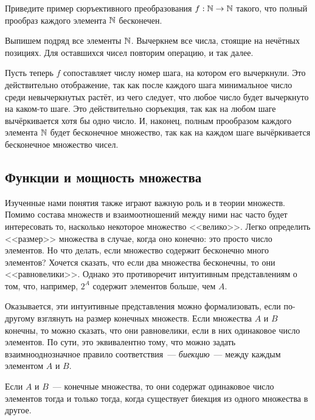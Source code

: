 \begin{Exercise}[counter=SecExercise, label={exercise:functions:infinite_surjection}]
    \noindent
    Приведите пример сюръективного преобразования $ f: \mathbb{N} \to \mathbb{N} $ такого, что полный прообраз каждого элемента $ \mathbb{N} $ бесконечен.
\end{Exercise}

\begin{Answer}
    \noindent
    Выпишем подряд все элементы $ \mathbb{N} $.
    Вычеркнем все числа, стоящие на нечётных позициях.
    Для оставшихся чисел повторим операцию, и так далее.

    Пусть теперь $ f $ сопоставляет числу номер шага, на котором его вычеркнули.
    Это действительно отображение, так как после каждого шага минимальное число среди невычеркнутых растёт,
    из чего следует, что любое число будет вычеркнуто на каком-то шаге.
    Это действительно сюръекция, так как на любом шаге вычёркивается хотя бы одно число.
    И, наконец, полным прообразом каждого элемента $ \mathbb{N} $ будет бесконечное множество,
    так как на каждом шаге вычёркивается бесконечное множество чисел.
\end{Answer}


\subsection{Функции и мощность множества}
\label{subsec:functions:cardinality}

Изученные нами понятия также играют важную роль и в теории множеств.
Помимо состава множеств и взаимоотношений между ними нас часто будет интересовать то, насколько некоторое множество <<велико>>.
Легко определить <<размер>> множества в случае, когда оно конечно: это просто число элементов.
Но что делать, если множество содержит бесконечно много элементов?
Хочется сказать, что если два множества бесконечны, то они <<равновелики>>.
Однако это противоречит интуитивным представлениям о том, что, например, $ 2^A $ содержит элементов больше, чем $ A $.

Оказывается, эти интуитивные представления можно формализовать, если по-другому взглянуть на размер конечных множеств.
Если множества $ A $ и $ B $ конечны, то можно сказать, что они равновелики, если в них одинаковое число элементов.
По сути, это эквивалентно тому, что можно задать взаимнооднозначное правило соответствия~--- \textit{биекцию}~--- между каждым элементом $ A $ и $ B $.

\begin{statement}
    \label{statement:functions:finite_bijection}
    Если $ A $ и $ B $~--- конечные множества, то они содержат одинаковое число элементов тогда и только тогда,
    когда существует биекция из одного множества в другое.
\end{statement}

